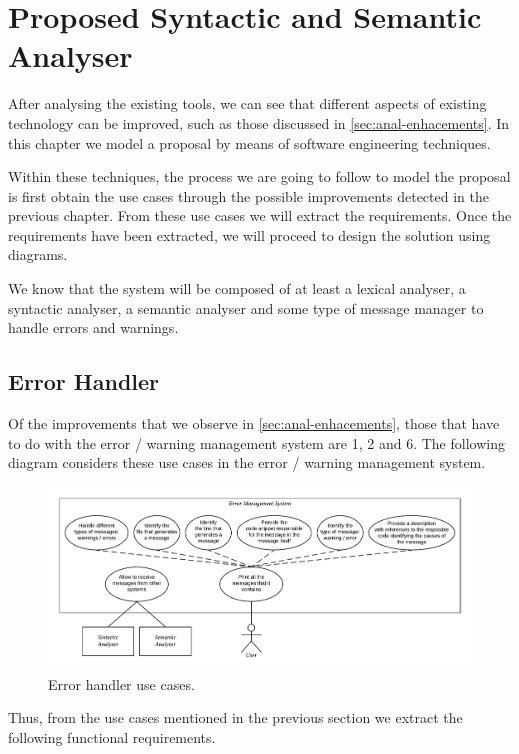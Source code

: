\chapter{Proposed Syntactic and Semantic Analyser}
\label{ch:proposed-sin-sema-anal}
After analysing the existing tools, we can see that different
aspects of existing technology can be improved, such as those
discussed in \cref{sec:anal-enhacements}. In this chapter we
model a proposal by means of software engineering techniques.

Within these techniques, the process we are going to follow
to model the proposal is first obtain the use cases through
the possible improvements detected in the previous chapter.
From these use cases we will extract the requirements. Once
the requirements have been extracted, we will proceed to
design the solution using diagrams.

We know that the system will be composed of at least a lexical
analyser, a syntactic analyser, a semantic analyser and some
type of message manager to handle errors and warnings.

\section{Error Handler}
Of the improvements that we observe in \cref{sec:anal-enhacements}, those
that have to do with the error / warning management
system are 1, 2 and 6. The following diagram considers
these use cases in the error / warning management system.

\begin{figure}[h!]
    \includegraphics[scale=0.6]{images/err-hand-use-case.pdf}
    \centering
    \caption[Error handler use cases]{Error handler use cases.}
    \label{fig:err-hand-use-case}
\end{figure}

Thus, from the use cases mentioned in the previous section we
extract the following functional requirements.

